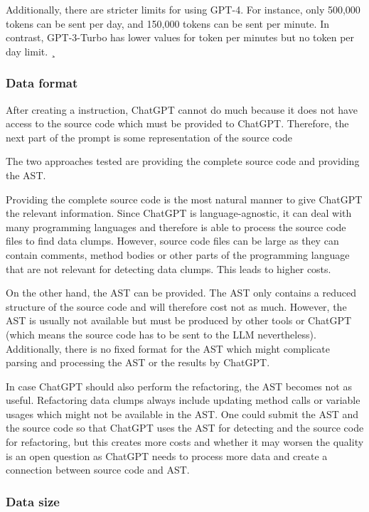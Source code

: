 Additionally, there are  stricter limits for using GPT-4. For instance, only 500,000 tokens can be sent per day, and 150,000 tokens can be sent per minute. In contrast, GPT-3-Turbo has  lower values for token per minutes but no  token per day limit.  ¸\cite{chatgpt_limits}

\subsubsection{Data format}

After creating a instruction, ChatGPT cannot do much because it does not have access to the source code which must be provided to ChatGPT. Therefore, the next part of the prompt is some representation of the source code

The two approaches tested are providing the complete source code and providing the \ac{AST}.

Providing the complete source code is the most natural manner to give ChatGPT the relevant information. Since ChatGPT is language-agnostic, it can deal with many programming languages and therefore is able to process the source code files to find data clumps. However, source code files can be large as they can contain comments, method bodies or other parts of the programming language that are not relevant for detecting data clumps. This leads to higher costs.

On the other hand, the \ac{AST} can be provided. The \ac{AST} only contains a reduced structure of the source code and will therefore cost not as much. However, the \ac{AST} is usually not available but must be produced by other tools or ChatGPT (which means the source code has to be sent to the \ac{LLM} nevertheless). Additionally, there is no fixed format for the \ac{AST} which might complicate parsing and processing the \ac{AST} or the results by ChatGPT.


In case ChatGPT should also perform the refactoring, the \ac{AST} becomes not as useful. Refactoring data clumps always include updating method calls or variable usages which might not be available in the \ac{AST}. One could submit the \ac{AST} and the source code so that ChatGPT uses the \ac{AST} for detecting and the source code for refactoring, but this creates more costs and whether it may worsen the quality is an open question as ChatGPT needs to process more data and create a connection between source code and \ac{AST}.
\subsubsection{Data size}

